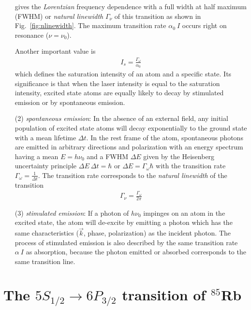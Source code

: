 \begin{itemize}
    \bigskip
    gives the \textit{Lorentzian} frequency dependence with a full width at half
    maximum (FWHM) or \textit{natural linewidth} \(\Gamma_\nu \) of this transition 
    as shown in Fig.~\ref{fig:nlinewidth}. The maximum transition rate \(\alpha_0~I \) 
    occurs right on resonance (\(\nu=\nu_0 \)).

    Another important value is 
    \begin{align}
        I_s = \frac{\Gamma_\omega}{\alpha_0} \label{eq:saturationInt}
    \end{align}
    which defines the saturation intensity of an atom and a specific state. Its 
    significance is that when the laser intensity is equal to the saturation intensity, 
    excited state atoms are equally likely to decay by stimulated emission or by 
    spontaneous emission.
\item[(2)] \textit{spontaneous emission}: In the absence of an external field,
    any initial population of excited state atoms will decay exponentially to the 
    ground state with a mean lifetime \(\Delta t\).
    In the rest frame of the atom, spontaneous photons are emitted in arbitrary 
    directions and polarization with an energy spectrum having a mean \( E = h \nu_0 \) 
    and a FWHM \(\Delta E \) given by the Heisenberg uncertainty principle
    \(\Delta E~\Delta t = \hbar \) or \(\Delta E = \Gamma_\omega \hbar \) with 
    the transition rate \(\Gamma_\omega = \frac{1}{\Delta t}\). The transition 
    rate corresponds to the \textit{natural linewidth} of the transition
    \begin{align}\label{eq:gamma_relation}
        \Gamma_{\nu} = \frac{\Gamma_\omega}{2\pi}
    \end{align}
\item[(3)] \textit{stimulated emission}: If a photon of \(h\nu_0 \) impinges on
    an atom in the excited state, the atom will de-excite by emitting a photon
    which has the same characteristics (\(\vec{k}\), phase, polarization) as the
    incident photon. The process of stimulated emission is also described by the
    same transition rate \(\alpha~I \) as absorption, because the photon emitted
    or absorbed corresponds to the same transition line.
\end{itemize}


\section{The \(5S_{1/2}\rightarrow 6P_{3/2}\) transition of \(^{85}\)Rb}   %

